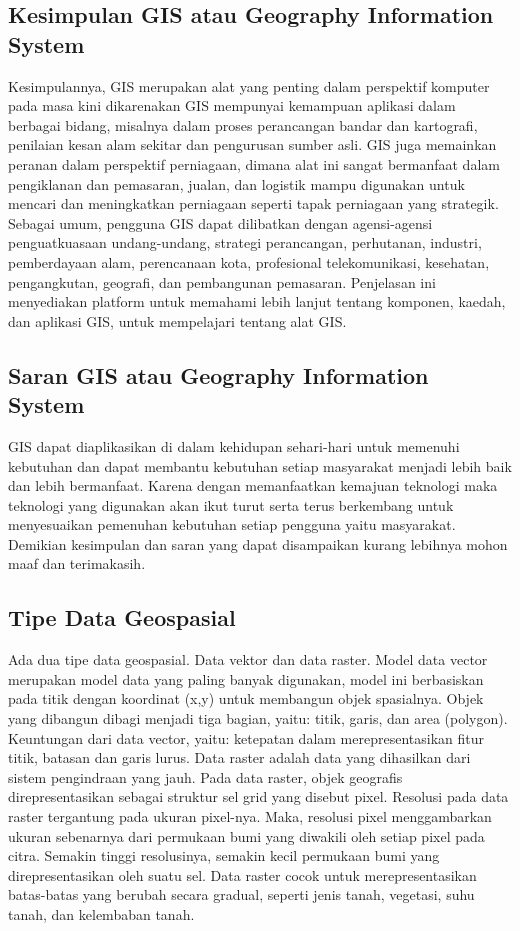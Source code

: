 \subsection{Kesimpulan GIS atau Geography Information System}
Kesimpulannya, GIS merupakan alat yang penting dalam perspektif komputer pada masa kini dikarenakan GIS
mempunyai kemampuan aplikasi dalam berbagai bidang, misalnya dalam proses perancangan bandar dan kartografi,
penilaian kesan alam sekitar dan pengurusan sumber asli. GIS juga memainkan peranan dalam perspektif perniagaan,
dimana alat ini sangat bermanfaat dalam pengiklanan dan pemasaran, jualan, dan logistik 
mampu digunakan untuk mencari dan meningkatkan perniagaan seperti tapak perniagaan yang strategik. Sebagai umum, pengguna GIS dapat dilibatkan dengan agensi-agensi penguatkuasaan undang-undang, strategi
perancangan, perhutanan, industri, pemberdayaan alam, perencanaan kota, profesional
telekomunikasi, kesehatan, pengangkutan, geografi, dan pembangunan pemasaran. 
Penjelasan ini menyediakan platform untuk memahami lebih lanjut tentang komponen, kaedah, dan aplikasi GIS, 
untuk mempelajari tentang alat GIS.
\subsection{Saran GIS atau Geography Information System}
GIS dapat diaplikasikan di dalam kehidupan sehari-hari untuk memenuhi kebutuhan dan dapat membantu kebutuhan setiap masyarakat menjadi lebih baik dan lebih bermanfaat. Karena dengan memanfaatkan kemajuan teknologi maka teknologi yang digunakan akan ikut turut serta terus berkembang untuk menyesuaikan pemenuhan kebutuhan setiap pengguna yaitu masyarakat. Demikian kesimpulan dan saran yang dapat disampaikan kurang lebihnya mohon maaf dan terimakasih.

\subsection{Tipe Data Geospasial}
Ada dua tipe data geospasial. Data vektor dan data raster. Model data vector merupakan model data yang paling banyak digunakan, model ini berbasiskan pada titik dengan koordinat (x,y) untuk membangun objek spasialnya. Objek yang dibangun
dibagi menjadi tiga bagian, yaitu: titik, garis, dan area (polygon).
Keuntungan dari data vector, yaitu: ketepatan dalam merepresentasikan fitur titik, batasan dan
garis lurus. Data raster adalah data yang dihasilkan dari sistem pengindraan yang jauh. Pada data raster,
objek geografis direpresentasikan sebagai struktur sel grid yang disebut pixel. Resolusi pada data
raster tergantung pada ukuran pixel-nya.
Maka, resolusi pixel menggambarkan ukuran sebenarnya dari permukaan bumi yang diwakili
oleh setiap pixel pada citra. Semakin tinggi resolusinya, semakin kecil permukaan bumi yang
direpresentasikan oleh suatu sel. Data raster cocok untuk merepresentasikan batas-batas yang
berubah secara gradual, seperti jenis tanah, vegetasi, suhu tanah, dan kelembaban tanah.

